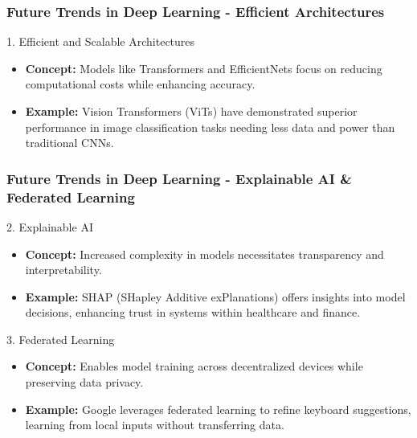 \documentclass[aspectratio=169]{beamer}
\begin{document}
\begin{frame}[fragile]
    \frametitle{Future Trends in Deep Learning - Efficient Architectures}
    \begin{block}{1. Efficient and Scalable Architectures}
        \begin{itemize}
            \item \textbf{Concept:} Models like Transformers and EfficientNets focus on reducing computational costs while enhancing accuracy.
            \item \textbf{Example:} Vision Transformers (ViTs) have demonstrated superior performance in image classification tasks needing less data and power than traditional CNNs.
        \end{itemize}
    \end{block}
\end{frame}

\begin{frame}[fragile]
    \frametitle{Future Trends in Deep Learning - Explainable AI & Federated Learning}
    \begin{block}{2. Explainable AI}
        \begin{itemize}
            \item \textbf{Concept:} Increased complexity in models necessitates transparency and interpretability.
            \item \textbf{Example:} SHAP (SHapley Additive exPlanations) offers insights into model decisions, enhancing trust in systems within healthcare and finance.
        \end{itemize}
    \end{block}

    \begin{block}{3. Federated Learning}
        \begin{itemize}
            \item \textbf{Concept:} Enables model training across decentralized devices while preserving data privacy.
            \item \textbf{Example:} Google leverages federated learning to refine keyboard suggestions, learning from local inputs without transferring data.
        \end{itemize}
    \end{block}
\end{frame}
\end{document}
